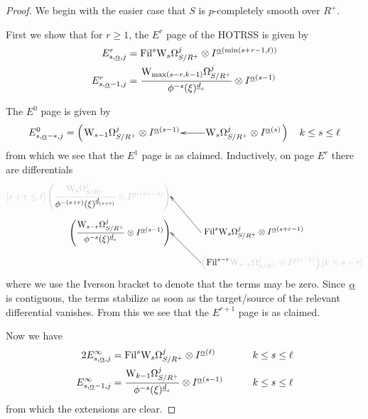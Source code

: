 \begin{proof}
  We begin with the easier case that $S$ is $p$-completely smooth over $R^+$.

  First we show that for $r\ge1$, the $E^r$ page of the HOTRSS is given by
  \begin{align*}
    E^r_{s,\m\alpha,j} &= \Fil^s\dRW[s]^j_{S/R^+} \tnsr I^{\m \alpha(\min(s+r-1,\ell))}\\
    E^r_{s,\m\alpha-1,j} &= \frac{\dRW[\max(s-r,k-1)]^j_{S/R^+}}{\phi^{-s}(\xi)^{\m d_s}} \tnsr I^{\m\alpha(s-1)}%
  \end{align*}

  The $E^0$ page is given by
  \[
    E^0_{s,\m\alpha-*,j} =
    \left(\xymatrix@1{
        \ds\dRW[s-1]^j_{S/R^+} \tnsr I^{\m\alpha(s-1)}%
        &
        \ar[l]
        \ds\dRW[s]^j_{S/R^+} \tnsr I^{\m\alpha(s)}%
      }\right)
      \quad k\le s\le \ell
  \]
  from which we see that the $E^1$ page is as claimed. Inductively, on page $E^r$ there are differentials
  \[\xymatrix@C=-15em@R=1em{
      *!R{\fade{[s+r\le\ell]\left(\ds\frac{\dRW[s]^j_{S/R^+}}{\fade[100]{\phi^{-(s+r)}(\xi)^{\m d_{(s+r)}}}} \tnsr I^{\m\alpha(s+r-1)}
      \right)}}\\
      *!R{\left(\ds\frac{\dRW[s-r]^j_{S/R^+}}{\phi^{-s}(\xi)^{\m d_s}} \tnsr
          I^{\m\alpha(s-1)}
  \right)}
     & *!L{\ \ds\Fil^s \dRW[s]^j_{S/R^+} \tnsr
       I^{\m\alpha(s+r-1)}
   } \ar[ul]\\
     & *!L{\fade{\left(\ds\fade[100]{\Fil^{s-r}} \dRW[s-r]^j_{S/R^+} \tnsr
           I^{\m\alpha(s-1)}
\right)[k\le s-r]}}
     \ar[ul]
  }\]
  where we use the Iverson bracket to denote that the terms may be zero. Since $\underline\alpha$ is contiguous, the terms stabilize as soon as the target/source of the relevant differential vanishes. From this we see that the $E^{r+1}$ page is as claimed.

  Now we have
  \begin{alignat*}2
    E^\infty_{s,\m\alpha,j} &= \Fil^s\dRW[s]^j_{S/R^+} \tnsr
    I^{\m\alpha(\ell)}
                            &\qquad& k\le s\le\ell\\
    E^\infty_{s,\m\alpha-1,j} &= \frac{\dRW[k-1]^j_{S/R^+}}{\phi^{-s}(\xi)^{\m d_s}} \tnsr
    I^{\m\alpha(s-1)}
                              && k \le s\le\ell
  \end{alignat*}
  from which the extensions are clear.


\end{proof}

